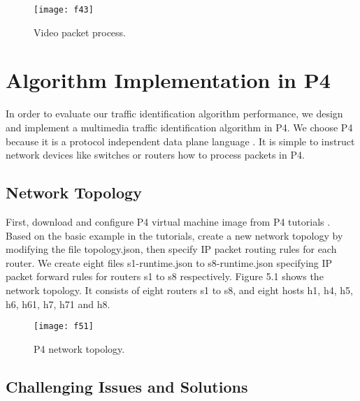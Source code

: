 \documentclass[master]{thesis}
\begin{document}
\begin{figure}[htp]
    \texttt{[image: f43]}
    \caption[Video packet process.]{Video packet process.}
    \label{fig:f43}
\end{figure}

\chapter{Algorithm Implementation in P4}
\label{chap:algorithm.implementation}

In order to evaluate our traffic identification algorithm performance, we design and implement a multimedia traffic identification algorithm in P4. We choose P4 because it is a protocol independent data plane language \cite{bosshart2014p4, p4162020}. It is simple to instruct network devices like switches or routers how to process packets in P4. 

\section{Network Topology}

First, download and configure P4 virtual machine image from P4 tutorials \cite{sigcommp4tutorial2020, p4tutorial2020}.  Based on the basic example in the tutorials, create a new network topology by modifying the file topology.json, then specify IP packet routing rules for each router. We create eight files s1-runtime.json to s8-runtime.json specifying IP packet forward rules for routers s1 to s8 respectively.  Figure 5.1 shows the network topology. It consists of eight routers s1 to s8, and eight hosts h1, h4, h5, h6, h61, h7, h71 and h8. 

\begin{figure}[htp]
    \texttt{[image: f51]}
    \caption[P4 network topology.]{P4 network topology.}
    \label{fig:f51}
\end{figure}

\section{Challenging Issues and Solutions}
\end{document}
